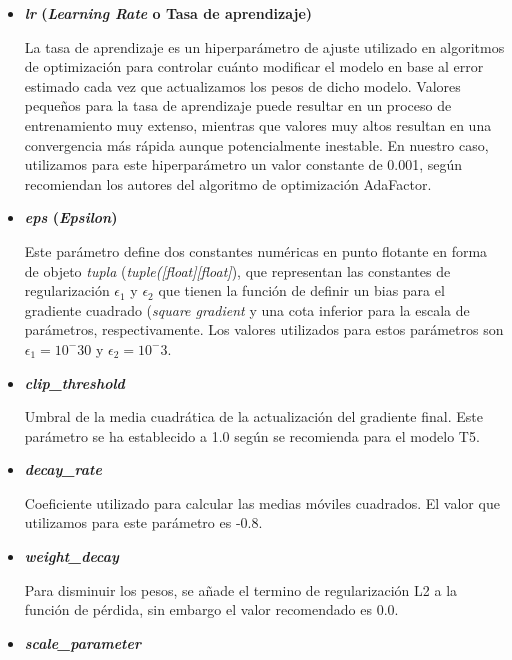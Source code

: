 \begin{itemize}
    \item \textbf{\textit{lr} (\textit{Learning Rate} o Tasa de aprendizaje)} \hfill
    
    La tasa de aprendizaje es un hiperparámetro de ajuste utilizado en algoritmos de optimización para controlar cuánto modificar el modelo en base al error estimado cada vez que actualizamos los pesos de dicho modelo. Valores pequeños para la tasa de aprendizaje puede resultar en un proceso de entrenamiento muy extenso, mientras que valores muy altos resultan en una convergencia más rápida aunque potencialmente inestable. En nuestro caso, utilizamos para este hiperparámetro un valor constante de 0.001, según recomiendan los autores del algoritmo de optimización AdaFactor.

    
    \item \textbf{\textit{eps} (\textit{Epsilon})} \hfill
    
    Este parámetro define dos constantes numéricas en punto flotante en forma de objeto \textit{tupla} (\textit{tuple([float][float]}), que representan las constantes de regularización $\epsilon_1$ y $\epsilon_2$ que tienen la función de definir un bias para el gradiente cuadrado (\textit{square gradient} y una cota inferior para la escala de parámetros, respectivamente. Los valores utilizados para estos parámetros son $\epsilon_1=10^-30$ y $\epsilon_2=10^-3$.
    
    
    \item \textbf{\textit{clip\_threshold}} \hfill
    
    Umbral de la media cuadrática de la actualización del gradiente final. Este parámetro se ha establecido a 1.0 según se recomienda para el modelo T5. 
    
    \item \textbf{\textit{decay\_rate}} \hfill
    
    Coeficiente utilizado para calcular las medias móviles cuadrados. El valor que utilizamos para este parámetro es -0.8.
    

    \item \textbf{\textit{weight\_decay }} \hfill
    
    Para disminuir los pesos, se añade el termino de regularización L2 a la función de pérdida, sin embargo el valor recomendado es 0.0.
    
    \item \textbf{\textit{scale\_parameter }} \hfill
    

\end{itemize}
